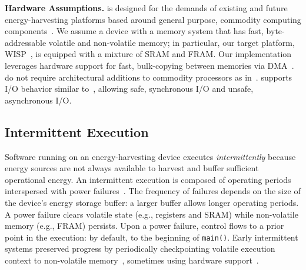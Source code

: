 \textbf{Hardware Assumptions.} \sys is designed for the demands of existing and future energy-harvesting platforms based around general purpose, commodity computing components~\cite{wisp,msp430datasheet}. We assume a device with a memory system that has fast, byte-addressable volatile and non-volatile memory; in particular, our target platform, WISP~\cite{wisp}, is equipped with a mixture of SRAM and FRAM. Our implementation leverages hardware support for fast, bulk-copying between memories via DMA~\cite{msp430datasheet}. \sys do not require architectural additions to commodity processors as in~\cite{su_date_2017,hicks_isca_2017,quickrecall,nvp}. \sys supports I/O behavior similar to~\cite{alpaca,chain}, allowing safe, synchronous I/O and unsafe, asynchronous I/O.

\subsection{Intermittent Execution}
\label{sec:background_consistency}


%
Software running on an energy-harvesting device executes {\em intermittently} because energy sources are not always available to harvest and buffer sufficient operational energy. An intermittent execution is composed of operating periods interspersed with power failures~\cite{dino,chain,alpaca,ratchet}. The frequency of failures depends on the size of the device's energy storage buffer: a larger buffer allows longer operating periods. 
A power failure clears volatile state (e.g., registers and SRAM) while non-volatile memory (e.g., FRAM) persists. Upon a power failure, control flows to a prior point in the execution: by default, to the beginning of {\tt main()}. Early intermittent systems preserved progress by periodically checkpointing volatile execution context to non-volatile memory~\cite{mementos}, sometimes using hardware support~\cite{mottola2017harvos,hibernusplusplus,hibernus,idetic,quickrecall}. 

